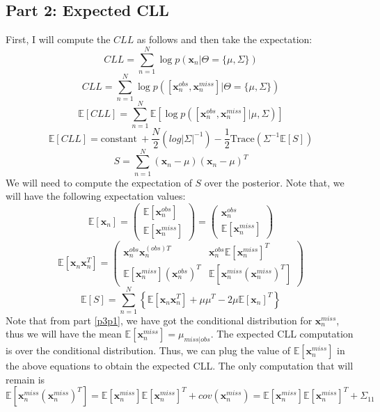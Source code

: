 \documentclass[a4paper,11pt]{article}
\begin{document}
\begin{mlsolution}
\subsection{Part 2: Expected CLL}
First, I will compute the $CLL$ as follows and then take the expectation:
\[
CLL = \sum_{n=1}^{N}\log p(\textbf{x}_n| \Theta=\{\mu, \Sigma\}) 
\]
\[
CLL = \sum_{n=1}^{N}\log p([\textbf{x}^{obs}_n, \textbf{x}^{miss}_n]| \Theta=\{\mu, \Sigma\})
\]
\[
\mathbb{E}[CLL] = \sum_{n=1}^{N}\mathbb{E}\left[ \log p([\textbf{x}^{obs}_n, \textbf{x}^{miss}_n]| \mu, \Sigma) \right] 
\]
\[
\boxed{\mathbb{E}[CLL] = \text{constant} \ + \frac{N}{2}(log |\Sigma|^{-1}) - \frac{1}{2}\text{Trace}(\Sigma^{-1}\mathbb{E}[S])}
\]
\[
S = \sum_{n=1}^{N} (\textbf{x}_{n}-\mu)(\textbf{x}_{n}-\mu)^{T}
\]
We will need to compute the expectation of $S$ over the posterior. Note that, we will have the following expectation values:
\begin{equation}
\label{eq1}
\mathbb{E}[\textbf{x}_n] = \begin{pmatrix}
\mathbb{E}[\textbf{x}^{obs}_n] \\
\mathbb{E}[\textbf{x}^{miss}_n] 
\end{pmatrix} = \begin{pmatrix}
\textbf{x}^{obs}_n \\ 
\mathbb{E}[\textbf{x}^{miss}_n] 
\end{pmatrix}
\end{equation}
\begin{equation}
\label{eq2}
\mathbb{E}[\textbf{x}_{n}\textbf{x}^{T}_{n}] = \begin{pmatrix}
\textbf{x}^{obs}_{n}\textbf{x}^{(obs)T}_{n} & \textbf{x}^{obs}_{n}\mathbb{E}[\textbf{x}^{miss}_{n}]^{T} \\
\mathbb{E}[\textbf{x}^{miss}_{n}](\textbf{x}^{obs}_{n})^{T} & \mathbb{E}[\textbf{x}^{miss}_{n}(\textbf{x}^{miss}_{n})^{T}]
\end{pmatrix}
\end{equation}
\begin{equation}
\label{eq3}
\mathbb{E}[S] = \sum_{n=1}^{N}\left\lbrace \mathbb{E}[\textbf{x}_{n}\textbf{x}^{T}_{n}] + \mu \mu^{T} - 2\mu \mathbb{E}[\textbf{x}_n]^{T} \right\rbrace
\end{equation}
Note that from part \ref{p3p1}, we have got the conditional distribution for $\textbf{x}^{miss}_{n}$, thus we will have the mean $\mathbb{E}[\textbf{x}^{miss}_{n}] = \mu_{miss|obs}$. The expected CLL computation is over the conditional distribution. Thus, we can plug the value of $\mathbb{E}[\textbf{x}^{miss}_{n}]$ in the above equations to obtain the expected CLL. The only computation that will remain is 
\[
\mathbb{E}[\textbf{x}^{miss}_{n}(\textbf{x}^{miss}_{n})^{T}] = \mathbb{E}[\textbf{x}^{miss}_{n}]\mathbb{E}[\textbf{x}^{miss}_{n}]^{T} + cov(\textbf{x}^{miss}_{n}) =  \mathbb{E}[\textbf{x}^{miss}_{n}]\mathbb{E}[\textbf{x}^{miss}_{n}]^{T} + \Sigma_{11}
\]


\end{mlsolution}
\end{document}
